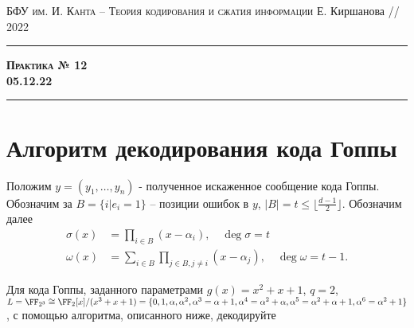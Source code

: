 \documentclass[11pt]{exam}
\theoremstyle{definition}
\newcommand*\abs[1]{\left\lvert#1\right\rvert}
\begin{document}
	{\noindent
		\textsc{БФУ им. И. Канта -- Теория кодирования и сжатия информации}
		\hfill {Е. Киршанова // 2022\\}
	\hrule
	\begin{center}
		{\Large\textbf{
				\textsc{Практика № 12} \\[5pt] {05.12.22}
		} } 
	\end{center}
	\hrule \vspace{5mm}
	
	\thispagestyle{empty}
	
	\vspace{0.2cm}
	
		
	
\section{Алгоритм декодирования кода Гоппы}
		Положим $y = (y_1, \ldots, y_n)$ - полученное искаженное сообщение кода Гоппы. Обозначим за $B = \{ i \vert e_i = 1\}$ -- позиции ошибок в $y$, $\abs{B} = t \leq \lfloor \frac{d-1}{2} \rfloor$. Обозначим далее
		\begin{align*}
				\sigma(x) &= \prod_{i \in B} (x - \alpha_i), \quad \deg \sigma = t \\
				\omega(x) & = \sum_{i \in B} \prod_{j \in B, j \neq i} (x - \alpha_j), \quad \deg \omega = t-1.
		\end{align*}
 	
 		Для кода Гоппы, заданного параметрами  $g(x) = x^2+x+1$, $q=2$, $L = \FF_{2^3} \cong \FF_2[x]/(x^3+x+1)  = \{ 0, 1, \alpha, \alpha^2, \alpha^3 = \alpha+1, \alpha^4 = \alpha^2 + \alpha, \alpha^5 = \alpha^2 + \alpha+1, \alpha^6 = \alpha^2+1 \}$, с помощью алгоритма, описанного ниже, декодируйте \\
 		
}
\end{document}
